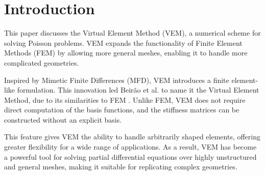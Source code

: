 \documentclass[class=article, crop=false]{standalone}
\begin{document}
\section{Introduction}

This paper discusses the Virtual Element Method (VEM), a numerical scheme for solving Poisson problems. VEM expands the functionality of Finite Element Methods (FEM) by allowing more general meshes, enabling it to handle more complicated geometries.

Inspired by Mimetic Finite Differences (MFD), VEM introduces a finite element-like formulation. This innovation led Beirão et al. to name it the Virtual Element Method, due to its similarities to FEM \cite{beirao2013basic}. Unlike FEM, VEM does not require direct computation of the basis functions, and the stiffness matrices can be constructed without an explicit basis.

This feature gives VEM the ability to handle arbitrarily shaped elements, offering greater flexibility for a wide range of applications. As a result, VEM has become a powerful tool for solving partial differential equations over highly unstructured and general meshes, making it suitable for replicating complex geometries.
\end{document}
